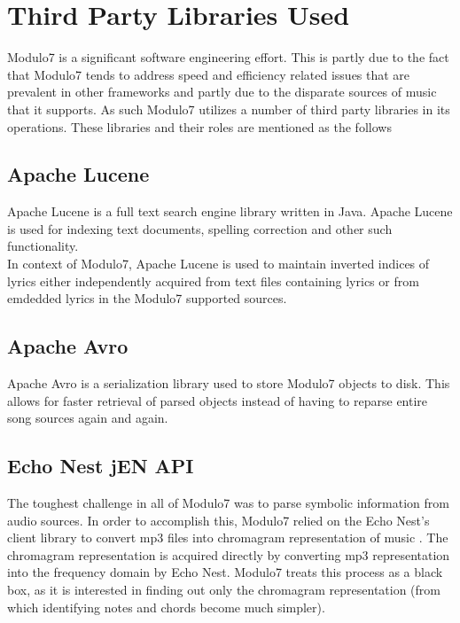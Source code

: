 \appendix
{}
\chapter{Third Party Libraries Used}

\noindent Modulo7 is a significant software engineering effort. This is partly due to the fact that Modulo7 tends to address speed and efficiency  related issues that are prevalent in other frameworks and partly due to the disparate sources of music that it supports. As such Modulo7 utilizes a number of third party libraries in its operations. These libraries and their roles are mentioned as the follows

\section{Apache Lucene}

\noindent Apache Lucene is a full text search engine library written in Java. Apache Lucene is used for indexing text documents, spelling correction and other such functionality. \\
In context of Modulo7, Apache Lucene is used to maintain inverted indices of lyrics either independently acquired from text files containing lyrics or from emdedded lyrics in the Modulo7 supported sources. 

\section{Apache Avro}

\noindent Apache Avro is a serialization library used to store Modulo7 objects to disk. This allows for faster retrieval of parsed objects instead of having to reparse entire song sources again and again.

\section{Echo Nest jEN API}

\noindent The toughest challenge in all of Modulo7 was to parse symbolic information from audio sources. In order to accomplish this, Modulo7 relied on the Echo Nest's client library to convert mp3 files into chromagram representation of music \cite{chromagramtutorial}. The chromagram representation is acquired directly by converting mp3 representation into the frequency domain by Echo Nest. Modulo7 treats this process as a black box, as it is interested in finding out only the chromagram representation (from which identifying notes and chords become much simpler). 


